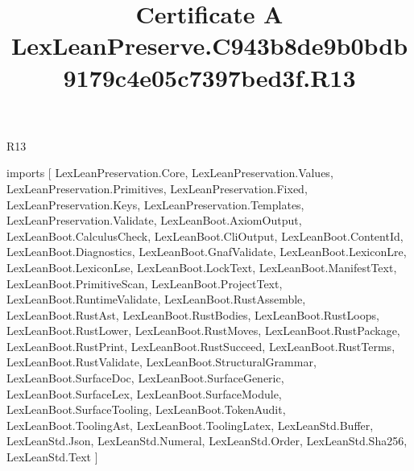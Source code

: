 \begin{lexlean}{R13}
\title{Certificate A LexLeanPreserve.C943b8de9b0bdb9179c4e05c7397bed3f.R13}
\begin{coremodule}
imports [
  LexLeanPreservation.Core,
  LexLeanPreservation.Values,
  LexLeanPreservation.Primitives,
  LexLeanPreservation.Fixed,
  LexLeanPreservation.Keys,
  LexLeanPreservation.Templates,
  LexLeanPreservation.Validate,
  LexLeanBoot.AxiomOutput,
  LexLeanBoot.CalculusCheck,
  LexLeanBoot.CliOutput,
  LexLeanBoot.ContentId,
  LexLeanBoot.Diagnostics,
  LexLeanBoot.GnafValidate,
  LexLeanBoot.LexiconLre,
  LexLeanBoot.LexiconLse,
  LexLeanBoot.LockText,
  LexLeanBoot.ManifestText,
  LexLeanBoot.PrimitiveScan,
  LexLeanBoot.ProjectText,
  LexLeanBoot.RuntimeValidate,
  LexLeanBoot.RustAssemble,
  LexLeanBoot.RustAst,
  LexLeanBoot.RustBodies,
  LexLeanBoot.RustLoops,
  LexLeanBoot.RustLower,
  LexLeanBoot.RustMoves,
  LexLeanBoot.RustPackage,
  LexLeanBoot.RustPrint,
  LexLeanBoot.RustSucceed,
  LexLeanBoot.RustTerms,
  LexLeanBoot.RustValidate,
  LexLeanBoot.StructuralGrammar,
  LexLeanBoot.SurfaceDoc,
  LexLeanBoot.SurfaceGeneric,
  LexLeanBoot.SurfaceLex,
  LexLeanBoot.SurfaceModule,
  LexLeanBoot.SurfaceTooling,
  LexLeanBoot.TokenAudit,
  LexLeanBoot.ToolingAst,
  LexLeanBoot.ToolingLatex,
  LexLeanStd.Buffer,
  LexLeanStd.Json,
  LexLeanStd.Numeral,
  LexLeanStd.Order,
  LexLeanStd.Sha256,
  LexLeanStd.Text
]


\end{coremodule}
\end{lexlean}
